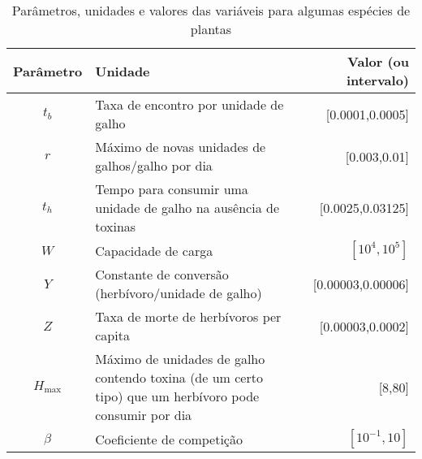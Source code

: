 \documentclass{article}
\begin{document}
\begin{table}[h!]
    \begin{tabular}{|c|p{9cm}|r|} \hline
    Parâmetro  & Unidade & Valor (ou intervalo) \\ \hline
    $t_b$ & Taxa de encontro por unidade de galho & [0.0001,0.0005] \\
    $r$ & Máximo de novas unidades de galhos/galho por dia & [0.003,0.01] \\
    $t_h$ & Tempo para consumir uma unidade de galho na ausência de toxinas & [0.0025,0.03125] \\
    $W$ & Capacidade de carga & $[10^4,10^5]$ \\
    $Y$ & Constante de conversão (herbívoro/unidade de galho) & [0.00003,0.00006] \\
    $Z$ & Taxa de morte de herbívoros per capita &  [0.00003,0.0002] \\
    $H_{\max}$ & Máximo de unidades de galho contendo toxina (de um certo tipo) que um herbívoro pode consumir por dia & [8,80] \\
    $\beta$ & Coeficiente de competição & $[10^{-1},10]$ \\ \hline
    \end{tabular}
    \caption{Parâmetros, unidades e valores das variáveis para algumas espécies de plantas}
    \label{tab:my_label}
\end{table}

\newpage



\end{document}
